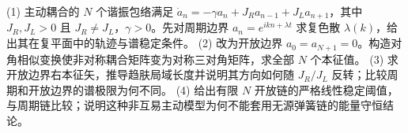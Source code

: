 (1) 主动耦合的 \(N\) 个谐振包络满足 \(\dot a_n=-\gamma a_n+J_Ra_{n-1}+J_La_{n+1}\)，其中 \(J_R,J_L>0\) 且 \(J_R\ne J_L\)，\(\gamma>0\)。先对周期边界 \(a_n=e^{ikn+\lambda t}\) 求复色散 \(\lambda(k)\)，给出其在复平面中的轨迹与谱稳定条件。
(2) 改为开放边界 \(a_0=a_{N+1}=0\)。构造对角相似变换使非对称耦合矩阵变为对称三对角矩阵，求全部 \(N\) 个本征值。
(3) 求开放边界右本征矢，推导趋肤局域长度并说明其方向如何随 \(J_R/J_L\) 反转；比较周期和开放边界的谱极限为何不同。
(4) 给出有限 \(N\) 开放链的严格线性稳定阈值，与周期链比较；说明这种非互易主动模型为何不能套用无源弹簧链的能量守恒结论。
